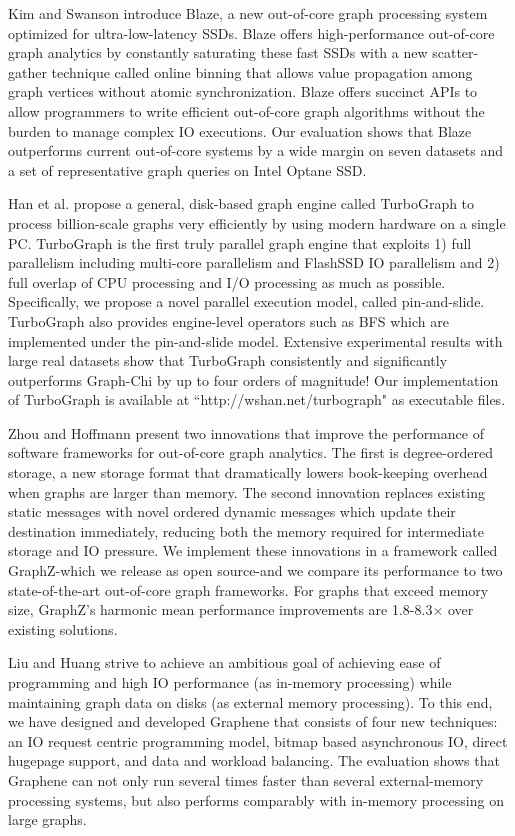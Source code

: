 Kim and Swanson \cite{kim2022blaze} introduce Blaze, a new out-of-core graph processing system optimized for ultra-low-latency SSDs. Blaze offers high-performance out-of-core graph analytics by constantly saturating these fast SSDs with a new scatter-gather technique called online binning that allows value propagation among graph vertices without atomic synchronization. Blaze offers succinct APIs to allow programmers to write efficient out-of-core graph algorithms without the burden to manage complex IO executions. Our evaluation shows that Blaze outperforms current out-of-core systems by a wide margin on seven datasets and a set of representative graph queries on Intel Optane SSD.

Han et al. \cite{han2013turbograph} propose a general, disk-based graph engine called TurboGraph to process billion-scale graphs very efficiently by using modern hardware on a single PC. TurboGraph is the first truly parallel graph engine that exploits 1) full parallelism including multi-core parallelism and FlashSSD IO parallelism and 2) full overlap of CPU processing and I/O processing as much as possible. Specifically, we propose a novel parallel execution model, called pin-and-slide. TurboGraph also provides engine-level operators such as BFS which are implemented under the pin-and-slide model. Extensive experimental results with large real datasets show that TurboGraph consistently and significantly outperforms Graph-Chi by up to four orders of magnitude! Our implementation of TurboGraph is available at ``http://wshan.net/turbograph" as executable files.

Zhou and Hoffmann \cite{zhou2018graphz} present two innovations that improve the performance of software frameworks for out-of-core graph analytics. The first is degree-ordered storage, a new storage format that dramatically lowers book-keeping overhead when graphs are larger than memory. The second innovation replaces existing static messages with novel ordered dynamic messages which update their destination immediately, reducing both the memory required for intermediate storage and IO pressure. We implement these innovations in a framework called GraphZ-which we release as open source-and we compare its performance to two state-of-the-art out-of-core graph frameworks. For graphs that exceed memory size, GraphZ's harmonic mean performance improvements are 1.8-8.3× over existing solutions.

Liu and Huang \cite{liu2017graphene} strive to achieve an ambitious goal of achieving ease of programming and high IO performance (as in-memory processing) while maintaining graph data on disks (as external memory processing). To this end, we have designed and developed Graphene that consists of four new techniques: an IO request centric programming model, bitmap based asynchronous IO, direct hugepage support, and data and workload balancing. The evaluation shows that Graphene can not only run several times faster than several external-memory processing systems, but also performs comparably with in-memory processing on large graphs.

